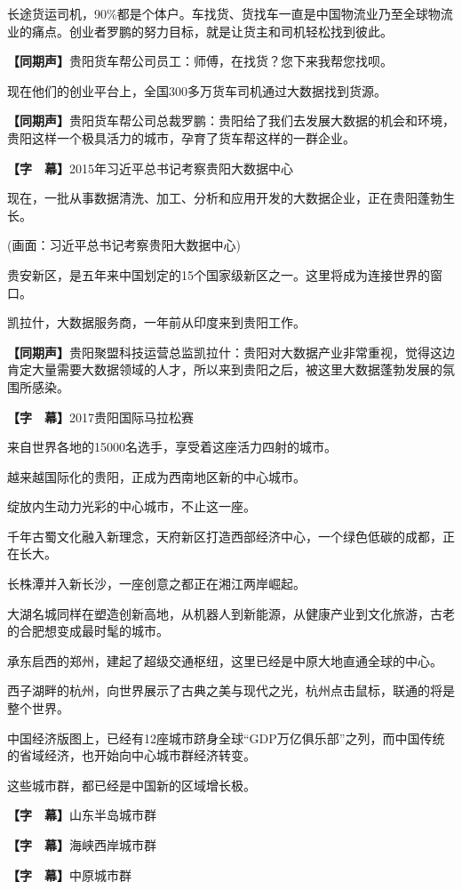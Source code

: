 \documentclass{ctexart}
\newcommand{\zkh}[1]{\textbf{\hspace{-2.7em} 【#1】}}
\begin{document}
长途货运司机，90{\%}都是个体户。车找货、货找车一直是中国物流业乃至全球物流业的痛点。创业者罗鹏的努力目标，就是让货主和司机轻松找到彼此。

\zkh{同期声}贵阳货车帮公司员工：师傅，在找货？您下来我帮您找呗。

现在他们的创业平台上，全国300多万货车司机通过大数据找到货源。

\zkh{同期声}贵阳货车帮公司总裁罗鹏：贵阳给了我们去发展大数据的机会和环境，贵阳这样一个极具活力的城市，孕育了货车帮这样的一群企业。

\zkh{字　幕}2015年习近平总书记考察贵阳大数据中心

现在，一批从事数据清洗、加工、分析和应用开发的大数据企业，正在贵阳蓬勃生长。

(画面：习近平总书记考察贵阳大数据中心)

贵安新区，是五年来中国划定的15个国家级新区之一。这里将成为连接世界的窗口。

凯拉什，大数据服务商，一年前从印度来到贵阳工作。

\zkh{同期声}贵阳聚盟科技运营总监凯拉什：贵阳对大数据产业非常重视，觉得这边肯定大量需要大数据领域的人才，所以来到贵阳之后，被这里大数据蓬勃发展的氛围所感染。

\zkh{字　幕}2017贵阳国际马拉松赛

来自世界各地的15000名选手，享受着这座活力四射的城市。

越来越国际化的贵阳，正成为西南地区新的中心城市。

绽放内生动力光彩的中心城市，不止这一座。

千年古蜀文化融入新理念，天府新区打造西部经济中心，一个绿色低碳的成都，正在长大。

长株潭并入新长沙，一座创意之都正在湘江两岸崛起。

大湖名城同样在塑造创新高地，从机器人到新能源，从健康产业到文化旅游，古老的合肥想变成最时髦的城市。

承东启西的郑州，建起了超级交通枢纽，这里已经是中原大地直通全球的中心。

西子湖畔的杭州，向世界展示了古典之美与现代之光，杭州点击鼠标，联通的将是整个世界。

中国经济版图上，已经有12座城市跻身全球``GDP万亿俱乐部''之列，而中国传统的省域经济，也开始向中心城市群经济转变。

这些城市群，都已经是中国新的区域增长极。

\zkh{字　幕}山东半岛城市群

\zkh{字　幕}海峡西岸城市群

\zkh{字　幕}中原城市群
\end{document}
